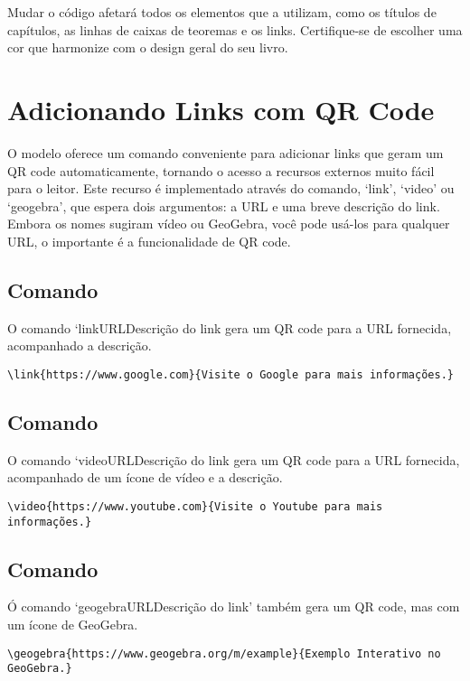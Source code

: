 \begin{obs}
    Mudar o código afetará todos os elementos que a utilizam, como os títulos de capítulos, as linhas de caixas de teoremas e os links. Certifique-se de escolher uma cor que harmonize com o design geral do seu livro.
\end{obs}

\section{Adicionando Links com QR Code}

O modelo oferece um comando conveniente para adicionar links que geram um QR code automaticamente, tornando o acesso a recursos externos muito fácil para o leitor. Este recurso é implementado através do comando, `link', `video' ou `geogebra', que espera dois argumentos: a URL e uma breve descrição do link. Embora os nomes sugiram vídeo ou GeoGebra, você pode usá-los para qualquer URL, o importante é a funcionalidade de QR code.

\subsection{Comando \texttt{\string\link}}

O comando `link{URL}{Descrição do link} gera um QR code para a URL fornecida, acompanhado a descrição. 

\begin{verbatim}
\link{https://www.google.com}{Visite o Google para mais informações.}
\end{verbatim}


\subsection{Comando \texttt{\string\video}}

O comando `video{URL}{Descrição do link} gera um QR code para a URL fornecida, acompanhado de um ícone de vídeo e a descrição. 

\begin{verbatim}
\video{https://www.youtube.com}{Visite o Youtube para mais informações.}
\end{verbatim}


\subsection{Comando \texttt{\string\geogebra}}

Ó comando `geogebra{URL}{Descrição do link}' também gera um QR code, mas com um ícone de GeoGebra. 

\begin{verbatim}
\geogebra{https://www.geogebra.org/m/example}{Exemplo Interativo no GeoGebra.}
\end{verbatim}

